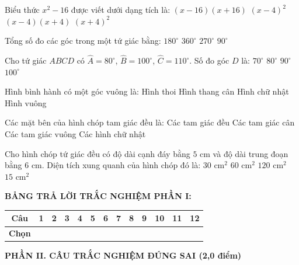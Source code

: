 \documentclass[12pt,a4paper]{article}
\begin{document}
\begin{ex}
Biểu thức $x^2 - 16$ được viết dưới dạng tích là:
\choice
{$(x - 16)(x + 16)$}
{$(x - 4)^2$}
{\True $(x - 4)(x + 4)$}
{$(x + 4)^2$}
\end{ex}

\begin{ex}
Tổng số đo các góc trong một tứ giác bằng:
\choice
{$180^\circ$}
{\True $360^\circ$}
{$270^\circ$}
{$90^\circ$}
\end{ex}

\begin{ex}
Cho tứ giác $ABCD$ có $\widehat{A} = 80^\circ$, $\widehat{B} = 100^\circ$, $\widehat{C} = 110^\circ$. Số đo góc $D$ là:
\choice
{\True $70^\circ$}
{$80^\circ$}
{$90^\circ$}
{$100^\circ$}
\end{ex}

\begin{ex}
Hình bình hành có một góc vuông là:
\choice
{Hình thoi}
{Hình thang cân}
{\True Hình chữ nhật}
{Hình vuông}
\end{ex}

\begin{ex}
Các mặt bên của hình chóp tam giác đều là:
\choice
{Các tam giác đều}
{\True Các tam giác cân}
{Các tam giác vuông}
{Các hình chữ nhật}
\end{ex}

\begin{ex}
Cho hình chóp tứ giác đều có độ dài cạnh đáy bằng $5\text{ cm}$ và độ dài trung đoạn bằng $6\text{ cm}$. Diện tích xung quanh của hình chóp đó là:
\choice
{$30\text{ cm}^2$}
{\True $60\text{ cm}^2$}
{$120\text{ cm}^2$}
{$15\text{ cm}^2$}
\end{ex}


\vspace{1mm}
\noindent\textbf{BẢNG TRẢ LỜI TRẮC NGHIỆM PHẦN I:}
\begin{center}
\begin{tabular}{|c|c|c|c|c|c|c|c|c|c|c|c|c|}
\hline
\textbf{Câu} & \textbf{1} & \textbf{2} & \textbf{3} & \textbf{4} & \textbf{5} & \textbf{6} & \textbf{7} & \textbf{8} & \textbf{9} & \textbf{10} & \textbf{11} & \textbf{12} \\
\hline
\textbf{Chọn} & \rule{0pt}{0.65cm} & & & & & & & & & & & \\
\hline
\end{tabular}
\end{center}
\vspace{2mm}

\setcounter{ex}{0}
\noindent\textbf{\large PHẦN II. CÂU TRẮC NGHIỆM ĐÚNG SAI (2,0 điểm)}
\end{document}
